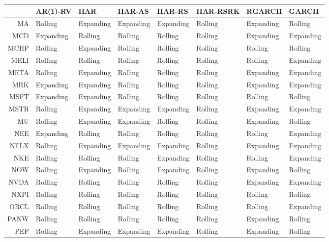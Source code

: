 \begin{table}[ht]
\centering
\begin{tabular}{rlllllll}
  \hline
 & AR(1)-RV & HAR & HAR-AS & HAR-RS & HAR-RSRK & RGARCH & GARCH \\ 
  \hline
MA & Rolling & Expanding & Expanding & Expanding & Rolling & Expanding & Rolling \\ 
  MCD & Expanding & Rolling & Rolling & Rolling & Rolling & Expanding & Expanding \\ 
  MCHP & Rolling & Expanding & Rolling & Rolling & Rolling & Rolling & Rolling \\ 
  MELI & Rolling & Rolling & Rolling & Rolling & Rolling & Rolling & Expanding \\ 
  META & Rolling & Expanding & Rolling & Rolling & Rolling & Expanding & Expanding \\ 
  MRK & Expanding & Expanding & Rolling & Rolling & Rolling & Expanding & Expanding \\ 
  MSFT & Expanding & Expanding & Rolling & Rolling & Rolling & Rolling & Rolling \\ 
  MSTR & Rolling & Expanding & Expanding & Expanding & Rolling & Expanding & Expanding \\ 
  MU & Rolling & Expanding & Expanding & Rolling & Rolling & Expanding & Rolling \\ 
  NEE & Expanding & Rolling & Rolling & Rolling & Rolling & Rolling & Expanding \\ 
  NFLX & Rolling & Expanding & Expanding & Expanding & Rolling & Expanding & Expanding \\ 
  NKE & Rolling & Rolling & Rolling & Expanding & Rolling & Rolling & Expanding \\ 
  NOW & Rolling & Expanding & Rolling & Expanding & Rolling & Expanding & Rolling \\ 
  NVDA & Rolling & Rolling & Rolling & Rolling & Rolling & Expanding & Expanding \\ 
  NXPI & Rolling & Rolling & Rolling & Rolling & Rolling & Rolling & Rolling \\ 
  ORCL & Rolling & Rolling & Rolling & Rolling & Rolling & Rolling & Expanding \\ 
  PANW & Rolling & Rolling & Rolling & Rolling & Rolling & Expanding & Rolling \\ 
  PEP & Rolling & Expanding & Expanding & Expanding & Rolling & Expanding & Rolling \\ 

\end{tabular}
\end{table}
